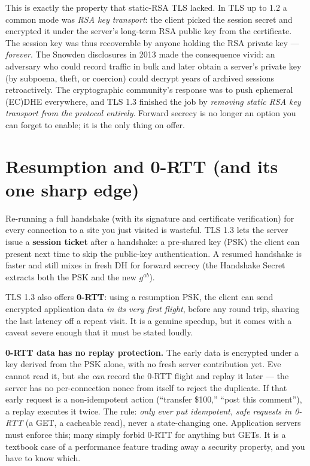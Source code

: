 \begin{historybox}
This is exactly the property that static-RSA TLS lacked. In TLS up to 1.2 a common
mode was \emph{RSA key transport}: the client picked the session secret and
encrypted it under the server's long-term RSA public key from the certificate. The
session key was thus recoverable by anyone holding the RSA private key ---
\emph{forever}. The Snowden disclosures in 2013 made the consequence vivid: an
adversary who could record traffic in bulk and later obtain a server's private key
(by subpoena, theft, or coercion) could decrypt years of archived sessions
retroactively. The cryptographic community's response was to push ephemeral
(EC)DHE everywhere, and TLS 1.3 finished the job by \emph{removing static RSA key
transport from the protocol entirely}. Forward secrecy is no longer an option you
can forget to enable; it is the only thing on offer.
\end{historybox}

\section{Resumption and 0-RTT (and its one sharp edge)}

Re-running a full handshake (with its signature and certificate verification) for
every connection to a site you just visited is wasteful. TLS 1.3 lets the server
issue a \textbf{session ticket} after a handshake: a pre-shared key (PSK) the client
can present next time to skip the public-key authentication. A resumed handshake
is faster and still mixes in fresh DH for forward secrecy (the Handshake Secret
extracts both the PSK and the new $g^{ab}$).

TLS 1.3 also offers \textbf{0-RTT}: using a resumption PSK, the client can send
encrypted application data \emph{in its very first flight}, before any round trip,
shaving the last latency off a repeat visit. It is a genuine speedup, but it comes
with a caveat severe enough that it must be stated loudly.

\begin{trapbox}
\textbf{0-RTT data has no replay protection.} The early data is encrypted under a
key derived from the PSK alone, with no fresh server contribution yet. Eve cannot
read it, but she \emph{can} record the 0-RTT flight and replay it later --- the
server has no per-connection nonce from itself to reject the duplicate. If that
early request is a non-idempotent action (``transfer \$100,'' ``post this
comment''), a replay executes it twice. The rule: \emph{only ever put idempotent,
safe requests in 0-RTT} (a GET, a cacheable read), never a state-changing one.
Application servers must enforce this; many simply forbid 0-RTT for anything but
GETs. It is a textbook case of a performance feature trading away a security
property, and you have to know which.
\end{trapbox}

